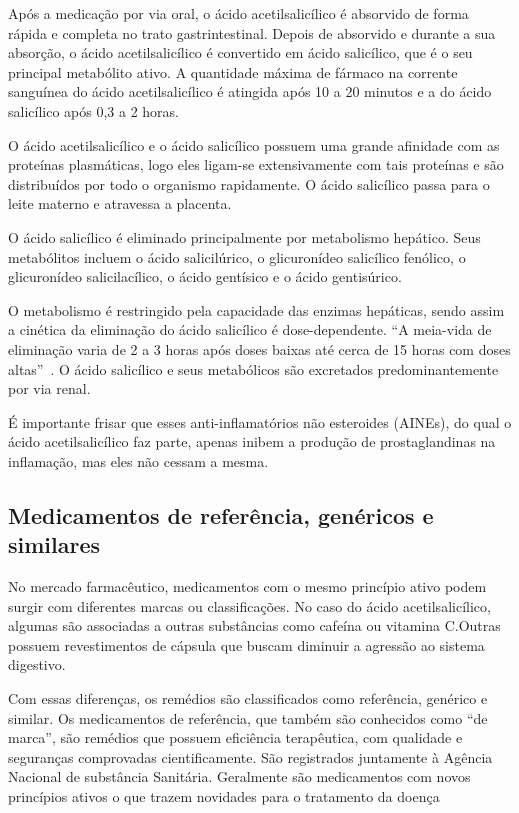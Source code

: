 Após a medicação por via oral, o ácido acetilsalicílico é absorvido de forma rápida e completa no
trato gastrintestinal. Depois de absorvido e durante a sua absorção, o ácido acetilsalicílico é
convertido em ácido salicílico, que é o seu principal metabólito ativo. A quantidade máxima de
fármaco na corrente sanguínea do ácido acetilsalicílico é atingida após 10 a 20 minutos e a do ácido
salicílico após 0,3 a 2 horas. 

O ácido acetilsalicílico e o ácido salicílico possuem uma grande afinidade com as proteínas
plasmáticas, logo eles ligam-se extensivamente com tais proteínas e são distribuídos por todo o
organismo rapidamente.  O ácido salicílico passa para o leite materno e atravessa a placenta.

O ácido salicílico é eliminado principalmente por metabolismo hepático. Seus metabólitos incluem o
ácido salicilúrico, o glicuronídeo salicílico fenólico, o glicuronídeo salicilacílico, o ácido
gentísico e o ácido gentisúrico.

O metabolismo é restringido pela capacidade das enzimas hepáticas, sendo assim a cinética da
eliminação do ácido salicílico é dose-dependente. “A meia-vida de eliminação varia de 2 a 3 horas
após doses baixas até cerca de 15 horas com doses altas”~\cite{bulaaspirina}. O ácido salicílico e
seus metabólicos são excretados predominantemente por via renal. 

É importante frisar que esses anti-inflamatórios não esteroides (AINEs), do qual o ácido
acetilsalicílico faz parte, apenas inibem a produção de prostaglandinas na inflamação, mas eles não
cessam a mesma.

\subsection{Medicamentos de referência, genéricos e similares}\label{refgensim}

No mercado farmacêutico, medicamentos com o mesmo princípio ativo podem surgir com diferentes marcas
ou classificações. No caso do ácido acetilsalicílico, algumas são associadas a outras substâncias
como cafeína ou vitamina C.Outras possuem revestimentos de cápsula que buscam diminuir a agressão ao
sistema digestivo.  \cite{prade2006}

Com essas diferenças, os remédios são classificados como referência, genérico e similar. Os
medicamentos de referência, que também são conhecidos como “de marca”, são remédios que possuem
eficiência terapêutica, com qualidade e seguranças comprovadas cientificamente. São registrados
juntamente à Agência Nacional de substância Sanitária. Geralmente são medicamentos com novos
princípios ativos o que trazem novidades para o tratamento da doença

